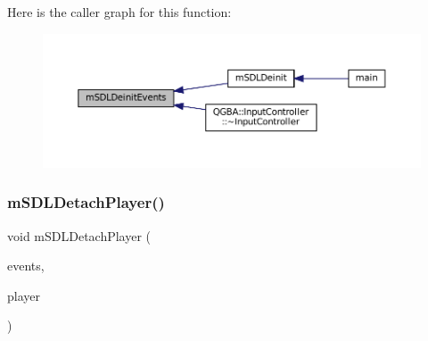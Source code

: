 Here is the caller graph for this function\+:
\nopagebreak
\begin{figure}[H]
\begin{center}
\leavevmode
\includegraphics[width=350pt]{sdl-events_8c_a619d2db362c7cc68e86f0428afc773c9_icgraph}
\end{center}
\end{figure}
\mbox{\label{sdl-events_8c_a64e440a5ad2a51018e3fe003e1b2615e}} 
\subsubsection{\texorpdfstring{m\+S\+D\+L\+Detach\+Player()}{mSDLDetachPlayer()}}
{\footnotesize\ttfamily void m\+S\+D\+L\+Detach\+Player (\begin{DoxyParamCaption}\item[{struct \mbox{\hyperlink{sdl-events_8h_structm_s_d_l_events}{m\+S\+D\+L\+Events}} $\ast$}]{events,  }\item[{struct \mbox{\hyperlink{sdl-events_8h_structm_s_d_l_player}{m\+S\+D\+L\+Player}} $\ast$}]{player }\end{DoxyParamCaption})}

